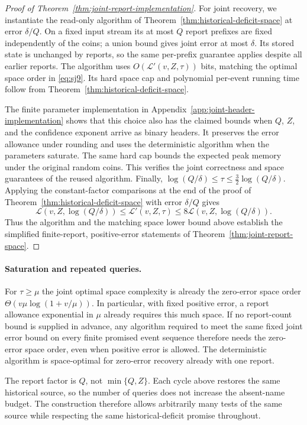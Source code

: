 \documentclass[11pt,letterpaper]{article}
\numberwithin{equation}{section}
\begin{document}
\begin{proof}[Proof of Theorem~\ref{thm:joint-report-implementation}]
For joint recovery, we instantiate the read-only algorithm of Theorem~\ref{thm:historical-deficit-space} at error $\delta/Q$.
On a fixed input stream its at most $Q$ report prefixes are fixed independently of the coins; a union bound gives joint error at most $\delta$.
Its stored state is unchanged by reports, so the same per-prefix guarantee applies despite all earlier reports.
The algorithm uses $O(\mathcal L'(v,Z,\tau))$ bits, matching the optimal space order in \eqref{eq:sj9}.
Its hard space cap and polynomial per-event running time follow from Theorem~\ref{thm:historical-deficit-space}.

The finite parameter implementation in Appendix~\ref{app:joint-header-implementation} shows that this choice also has the claimed bounds when $Q$, $Z$, and the confidence exponent arrive as binary headers.
It preserves the error allowance under rounding and uses the deterministic algorithm when the parameters saturate.
The same hard cap bounds the expected peak memory under the original random coins.
This verifies the joint correctness and space guarantees of the reused algorithm.
Finally, $\log(Q/\delta)\le\tau\le\tfrac32\log(Q/\delta)$.
Applying the constant-factor comparisons at the end of the proof of Theorem~\ref{thm:historical-deficit-space} with error $\delta/Q$ gives
\[
 \mathcal L(v,Z,\log(Q/\delta))
 \le \mathcal L'(v,Z,\tau)
 \le 8\mathcal L(v,Z,\log(Q/\delta)).
\]
Thus the algorithm and the matching space lower bound above establish the simplified finite-report, positive-error statements of Theorem~\ref{thm:joint-report-space}.
\end{proof}

\paragraph{Saturation and repeated queries.}
For $\tau\ge\mu$ the joint optimal space complexity is already the zero-error space order $\Theta(v\mu\log(1+v/\mu))$.
In particular, with fixed positive error, a report allowance exponential in $\mu$ already requires this much space.
If no report-count bound is supplied in advance, any algorithm required to meet the same fixed joint error bound on every finite promised event sequence therefore needs the zero-error space order, even when positive error is allowed.
The deterministic algorithm is space-optimal for zero-error recovery already with one report.

The report factor is $Q$, not $\min\{Q,Z\}$.
Each cycle above restores the same historical source, so the number of queries does not increase the absent-name budget.
The construction therefore allows arbitrarily many tests of the same source while respecting the same historical-deficit promise throughout.
\end{document}
